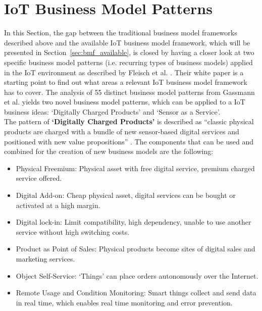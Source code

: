 \section{IoT Business Model Patterns}
\label{sec:patterns}	
\vspace{-1em}
	In this Section, the gap between the traditional business model frameworks described above and the available IoT business model framework, which will be presented in Section~\ref{sec:bmf_available}, is closed by having a closer look at two specific business model patterns (i.e. recurring types of business models) applied in the IoT environment as described by Fleisch et al. \cite{fleisch}. Their white paper is a starting point to find out what areas a relevant IoT business model framework has to cover. The analysis of 55 distinct business model patterns from Gassmann et al. \cite{gassmann55} yields two novel business model patterns, which can be applied to a IoT business ideas: `Digitally Charged Products' and `Sensor as a Service'.\\
	The pattern of \textbf{`Digitally Charged Products'} is described as ``classic physical products are charged with a bundle of new sensor-based digital services and positioned with new value propositions'' \cite{fleisch}. The components that can be used and combined for the creation of new business models are the following:

	\begin{itemize}
		\item Physical Freemium: Physical asset with free digital service, premium charged service offered.
		\item Digital Add-on: Cheap physical asset, digital services can be bought or activated at a high margin.
		\item Digital lock-in: Limit compatibility, high dependency, unable to use another service without high switching costs.
		\item Product as Point of Sales: Physical products become sites of digital sales and marketing services.
		\item Object Self-Service: `Things' can place orders autonomously over the Internet. 
		\item Remote Usage and Condition Monitoring: Smart things collect and send data in real time, which enables real time monitoring and error prevention.
	\end{itemize}

